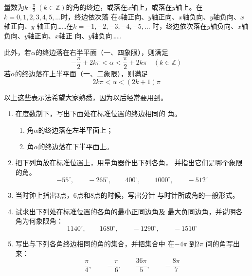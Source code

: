 量数为$k\cdot \frac{\pi}{2}\; (k\in\mathbb{Z})$的角的终边，或落在$x$轴上，或落在$y$轴上。在$k=0,1,2,3,4,5,\ldots$时，终边依次落
在$z$轴正向、$y$轴正向、$x$轴负向、$y$轴负向、$x$轴正向、$y$
轴正向……在$k=-1,-2,-3,-4,-5,\ldots$
时，终边依次落在$y$轴负向、$x$轴负向、$y$轴正向、$x$轴正
向、$y$轴负向……

此外，若$\alpha$的终边落在右半平面（一、四象限），则满足
\[-\frac{\pi}{2}+2k\pi<\alpha<\frac{\pi}{2}+2k\pi\quad (k\in\mathbb{Z})\]
若$\alpha$的终边落在上半平面（一、二象限），则满足
\[2k\pi <\alpha<(2k+1)\pi \]

以上这些表示法希望大家熟悉，因为以后经常要用到。

\begin{ex}
\begin{enumerate}
    \item 在度数制下，写出下面处在标准位置的终边相同的
    角。
        \begin{enumerate}    
    \item 角$\alpha$的终边落在左半平面上；
    \item 角$\alpha$的终边落在下半平面上。     
    \end{enumerate}

    
    \item 把下列角放在标准位置上，用量角器作出下列各角，
    并指出它们是哪个象限的角。
    \[-55^{\circ},\qquad -265^{\circ},\qquad 400^{\circ} ,\qquad 1000^{\circ},\qquad -512^{\circ} \]

    \item 当时钟上指出3点，6点和8点的时候，写出分针
    与时针所成角的一般形式。
    \item 试求出下列处在标准位置的各角的最小正同边角及
    最大负同边角，并说明各角为何象限角：
    \[1140^{\circ},\qquad 1680^{\circ},\qquad -1290^{\circ},\qquad -1510^{\circ}\]
\item 写出与下列各角终边相同的角的集合，并把集合中
在$-4\pi$ 到$2\pi$ 间的角写出来：
\[\frac{\pi}{4},\qquad -\frac{\pi}{6},\qquad \frac{36\pi}{5},\qquad -\frac{8\pi}{7}\]
\end{enumerate} 
\end{ex}

